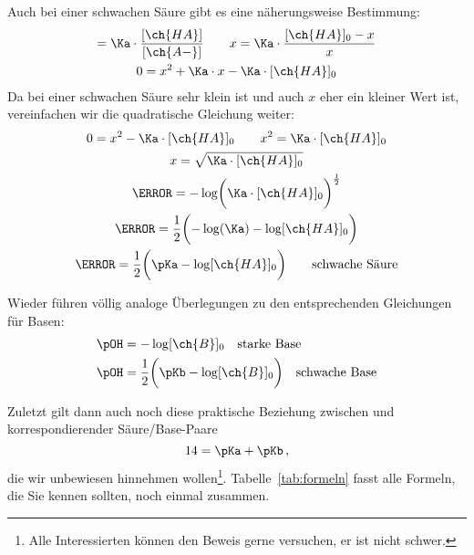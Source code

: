 \documentclass{arbeitsblatt}
\begin{document}
Auch bei einer schwachen Säure gibt es eine näherungsweise Bestimmung:
\begin{gather}
  [\ch{H3O+}] = \Ka \cdot \frac{ [\ch{HA}] }{ [\ch{A-}] }
    \qquad  x = \Ka \cdot \frac{ [\ch{HA}]_0 - x }{ x } \\
  0 = x^2 + \Ka \cdot x - \Ka \cdot [\ch{HA}]_0
\end{gather}
Da bei einer schwachen Säure \Ka sehr klein ist und auch $x$ eher ein kleiner
Wert ist, vereinfachen wir die quadratische Gleichung weiter:
\begin{gather}
  0 = x^2 - \Ka \cdot [\ch{HA}]_0 \qquad x^2 = \Ka \cdot [\ch{HA}]_0 \\
  x = \sqrt{ \Ka \cdot [\ch{HA}]_0 } \\
  \pH = -\log\biggl(\Ka \cdot [\ch{HA}]_0 \biggr)^\frac{1}{2} \\
  \pH = \frac{1}{2} \biggl( -\log(\Ka) - \log[\ch{HA}]_0 \biggr) \\
  \pH = \frac{1}{2} \biggl( \pKa - \log[\ch{HA}]_0 \biggr)
    \qquad \text{schwache Säure}\label{eq:schwache_saeure}
\end{gather}

Wieder führen völlig analoge Überlegungen zu den entsprechenden Gleichungen
für Basen:
\begin{align}
  \pOH &= -\log[\ch{B}]_0 \quad \text{starke Base} \\
  \pOH &= \frac{1}{2} \biggl( \pKb - \log[\ch{B}]_0 \biggr)
    \quad \text{schwache Base}
\end{align}

Zuletzt gilt dann auch noch diese praktische Beziehung zwischen \pKa{} und
\pKb{}  korrespondierender
Säure/Base-Paare
\begin{equation}
  14 = \pKa + \pKb  \,,
\end{equation}
die wir unbewiesen hinnehmen wollen\footnote{Alle Interessierten können den
  Beweis gerne versuchen, er ist nicht schwer.}. Tabelle~\ref{tab:formeln}
fasst alle Formeln, die Sie kennen sollten, noch einmal zusammen.
\end{document}
